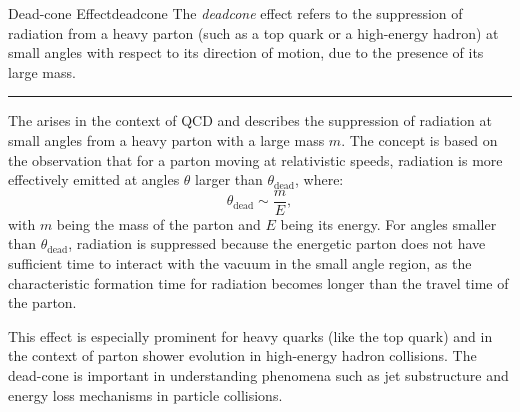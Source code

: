     \begin{definitionbox}{Dead-cone Effect}{deadcone}
        The \emph{\gls{deadcone}} effect refers to the suppression of radiation from a heavy parton (such as a top quark or a high-energy hadron) at small angles with respect to its direction of motion, due to the presence of its large mass.

        \vspace{7pt}
        \hrule
        \vspace{7pt}

        The  arises in the context of QCD and describes the suppression of radiation at small angles from a heavy parton with a large mass \( m \). The concept is based on the observation that for a parton moving at relativistic speeds, radiation is more effectively emitted at angles \( \theta \) larger than \( \theta_{\text{dead}} \), where:
        \[
        \theta_{\text{dead}} \sim \frac{m}{E},
        \]
        with \( m \) being the mass of the parton and \( E \) being its energy. For angles smaller than \( \theta_{\text{dead}} \), radiation is suppressed because the energetic parton does not have sufficient time to interact with the vacuum in the small angle region, as the characteristic formation time for radiation becomes longer than the travel time of the parton.

        This effect is especially prominent for heavy quarks (like the top quark) and in the context of parton shower evolution in high-energy hadron collisions. The dead-cone is important in understanding phenomena such as jet substructure and energy loss mechanisms in particle collisions.
    \end{definitionbox}

